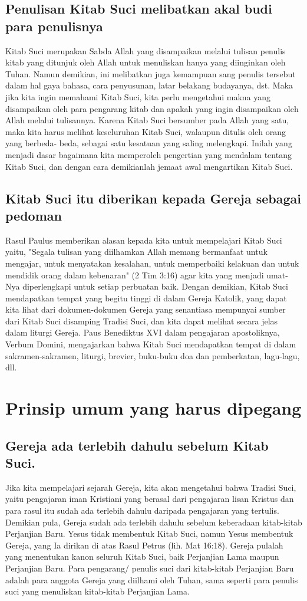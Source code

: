 \subsection{Penulisan Kitab Suci melibatkan akal budi para penulisnya}
Kitab Suci merupakan Sabda Allah yang disampaikan melalui tulisan penulis kitab yang ditunjuk oleh Allah untuk menuliskan hanya yang diinginkan oleh Tuhan. Namun demikian, ini melibatkan juga kemampuan sang penulis tersebut dalam hal gaya bahasa, cara penyusunan, latar belakang budayanya, dst. Maka jika kita ingin memahami Kitab Suci, kita perlu mengetahui makna yang disampaikan oleh para pengarang kitab dan apakah yang ingin disampaikan oleh Allah melalui tulisannya. Karena Kitab Suci bersumber pada Allah yang satu, maka kita harus melihat keseluruhan Kitab Suci, walaupun ditulis oleh orang yang berbeda- beda, sebagai satu kesatuan yang saling melengkapi. Inilah yang menjadi dasar bagaimana kita memperoleh pengertian yang mendalam tentang Kitab Suci, dan dengan cara demikianlah jemaat awal mengartikan Kitab Suci.

\subsection{Kitab Suci itu diberikan kepada Gereja sebagai pedoman}
Rasul Paulus memberikan alasan kepada kita untuk mempelajari Kitab Suci yaitu, "Segala tulisan yang diilhamkan Allah memang bermanfaat untuk mengajar, untuk menyatakan kesalahan, untuk memperbaiki kelakuan dan untuk mendidik orang dalam kebenaran" (2 Tim 3:16) agar kita yang menjadi umat-Nya diperlengkapi untuk setiap perbuatan baik. Dengan demikian, Kitab Suci mendapatkan tempat yang begitu tinggi di dalam Gereja Katolik, yang dapat kita lihat dari dokumen-dokumen Gereja yang senantiasa mempunyai sumber dari Kitab Suci disamping Tradisi Suci, dan kita dapat melihat secara jelas dalam liturgi Gereja. Paus Benediktus XVI dalam pengajaran apostoliknya, Verbum Domini, mengajarkan bahwa Kitab Suci mendapatkan tempat di dalam sakramen-sakramen, liturgi, brevier, buku-buku doa dan pemberkatan, lagu-lagu, dll.

\section{Prinsip umum yang harus dipegang}
\subsection{Gereja ada terlebih dahulu sebelum Kitab Suci.}
Jika kita mempelajari sejarah Gereja, kita akan mengetahui bahwa Tradisi Suci, yaitu pengajaran iman Kristiani yang berasal dari pengajaran lisan Kristus dan para rasul itu sudah ada terlebih dahulu daripada pengajaran yang tertulis. Demikian pula, Gereja sudah ada terlebih dahulu sebelum keberadaan kitab-kitab Perjanjian Baru. Yesus tidak membentuk Kitab Suci, namun Yesus membentuk Gereja, yang Ia dirikan di atas Rasul Petrus (lih. Mat 16:18). Gereja pulalah yang menentukan kanon seluruh Kitab Suci, baik Perjanjian Lama maupun Perjanjian Baru. Para pengarang/ penulis suci dari kitab-kitab Perjanjian Baru adalah para anggota Gereja yang diilhami oleh Tuhan, sama seperti para penulis suci yang menuliskan kitab-kitab Perjanjian Lama.


